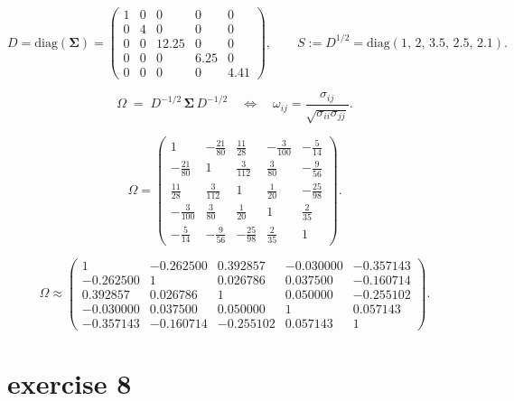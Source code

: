 \documentclass{article}
\let\normalSigma\Sigma
\renewcommand{\Sigma}{\bm{\normalSigma}} %
\begin{document}
\[
    D=\mathrm{diag}(\Sigma)=
    \begin{pmatrix}
        1 & 0 & 0     & 0    & 0    \\
        0 & 4 & 0     & 0    & 0    \\
        0 & 0 & 12.25 & 0    & 0    \\
        0 & 0 & 0     & 6.25 & 0    \\
        0 & 0 & 0     & 0    & 4.41
    \end{pmatrix},
    \qquad
    S:=D^{1/2}=\mathrm{diag}(1,\,2,\,3.5,\,2.5,\,2.1).
\]

\[
    \Omega \;=\; D^{-1/2}\,\Sigma\,D^{-1/2}
    \quad\Longleftrightarrow\quad
    \omega_{ij}=\frac{\sigma_{ij}}{\sqrt{\sigma_{ii}\sigma_{jj}}}.
\]

\[
    \Omega =
    \begin{pmatrix}
        1               & -\tfrac{21}{80} & \tfrac{11}{28}  & -\tfrac{3}{100} & -\tfrac{5}{14}  \\
        -\tfrac{21}{80} & 1               & \tfrac{3}{112}  & \tfrac{3}{80}   & -\tfrac{9}{56}  \\
        \tfrac{11}{28}  & \tfrac{3}{112}  & 1               & \tfrac{1}{20}   & -\tfrac{25}{98} \\
        -\tfrac{3}{100} & \tfrac{3}{80}   & \tfrac{1}{20}   & 1               & \tfrac{2}{35}   \\
        -\tfrac{5}{14}  & -\tfrac{9}{56}  & -\tfrac{25}{98} & \tfrac{2}{35}   & 1
    \end{pmatrix}.
\]

\[
    \Omega \approx
    \begin{pmatrix}
        1         & -0.262500 & 0.392857  & -0.030000 & -0.357143 \\
        -0.262500 & 1         & 0.026786  & 0.037500  & -0.160714 \\
        0.392857  & 0.026786  & 1         & 0.050000  & -0.255102 \\
        -0.030000 & 0.037500  & 0.050000  & 1         & 0.057143  \\
        -0.357143 & -0.160714 & -0.255102 & 0.057143  & 1
    \end{pmatrix}.
\]


\section{exercise 8}
\end{document}
